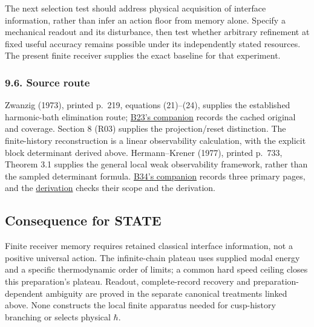 \documentclass[11pt,a4paper]{article}
\begin{document}
The next selection test should address physical acquisition of interface
information, rather than infer an action floor from memory alone.
Specify a mechanical readout and its disturbance, then test whether
arbitrary refinement at fixed useful accuracy remains possible under its
independently stated resources. The present finite receiver supplies the
exact baseline for that experiment.

\hypertarget{source-route}{%
\subsubsection{9.6. Source route}\label{source-route}}

Zwanzig (1973), printed p.~219, equations (21)--(24), supplies the
established harmonic-bath elimination route;
\href{../docs/batches/B23/harmonic-receiver-source-companion.md}{B23's
companion} records the cached original and coverage. Section 8 (R03)
supplies the projection/reset distinction. The finite-history
reconstruction is a linear observability calculation, with the explicit
block determinant derived above. Hermann--Krener (1977), printed p.~733,
Theorem 3.1 supplies the general local weak observability framework,
rather than the sampled determinant formula.
\href{../docs/batches/B34/receiver-memory-source-companion.md}{B34's
companion} records three primary pages, and the
\href{conservative-harmonic-receiver.md}{derivation} checks their scope
and the derivation.

\hypertarget{consequence-for-state}{%
\subsection{Consequence for STATE}\label{consequence-for-state}}

Finite receiver memory requires retained classical interface
information, not a positive universal action. The infinite-chain plateau
uses supplied modal energy and a specific thermodynamic order of limits;
a common hard speed ceiling closes this preparation's plateau. Readout,
complete-record recovery and preparation-dependent ambiguity are proved
in the separate canonical treatments linked above. None constructs the
local finite apparatus needed for cusp-history branching or selects
physical \(\hbar\).
\end{document}
